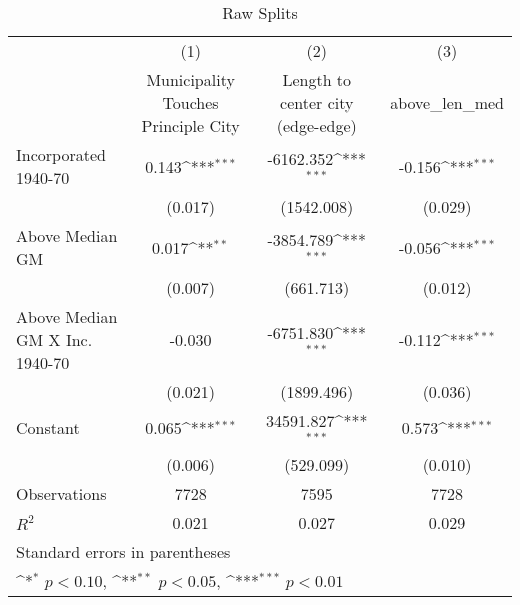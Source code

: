 \begin{table}[htbp]\centering
\def\sym#1{\ifmmode^{#1}\else\(^{#1}\)\fi}
\caption{Raw Splits}
\begin{tabular}{l*{3}{c}}
\hline\hline
                    &\multicolumn{1}{c}{(1)}&\multicolumn{1}{c}{(2)}&\multicolumn{1}{c}{(3)}\\
                    &\multicolumn{1}{c}{Municipality Touches Principle City}&\multicolumn{1}{c}{Length to center city (edge-edge)}&\multicolumn{1}{c}{above\_len\_med}\\
\hline
Incorporated 1940-70&       0.143\sym{***}&   -6162.352\sym{***}&      -0.156\sym{***}\\
                    &     (0.017)         &  (1542.008)         &     (0.029)         \\
[1em]
Above Median GM     &       0.017\sym{**} &   -3854.789\sym{***}&      -0.056\sym{***}\\
                    &     (0.007)         &   (661.713)         &     (0.012)         \\
[1em]
Above Median GM X Inc. 1940-70&      -0.030         &   -6751.830\sym{***}&      -0.112\sym{***}\\
                    &     (0.021)         &  (1899.496)         &     (0.036)         \\
[1em]
Constant            &       0.065\sym{***}&   34591.827\sym{***}&       0.573\sym{***}\\
                    &     (0.006)         &   (529.099)         &     (0.010)         \\
\hline
Observations        &        7728         &        7595         &        7728         \\
\(R^{2}\)           &       0.021         &       0.027         &       0.029         \\
\hline\hline
\multicolumn{4}{l}{\footnotesize Standard errors in parentheses}\\
\multicolumn{4}{l}{\footnotesize \sym{*} \(p<0.10\), \sym{**} \(p<0.05\), \sym{***} \(p<0.01\)}\\
\end{tabular}
\end{table}
